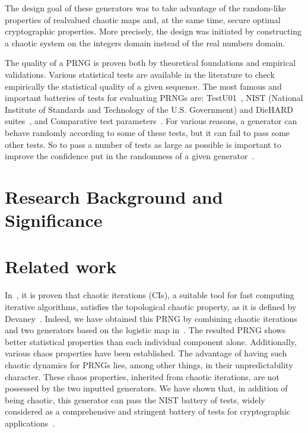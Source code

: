 The design goal of  these generators was to take advantage of the random-like properties of realvalued
chaotic maps and, at the same time, secure optimal cryptographic properties. More precisely, the design was initiated by constructing a chaotic system
on the integers domain instead of the real numbers domain.

The quality of a PRNG is proven both by theoretical foundations and empirical validations. 
Various statistical tests are available in the literature to check empirically the statistical quality of a given sequence.
The most famous and important batteries of tests for evaluating PRNGs are: TestU01~\cite{Lecuyer2009}, 
NIST (National Institute of Standards and Technology of the U.S. Government) and DieHARD suites~\cite{ANDREW2008,Marsaglia1996}, and Comparative test parameters~\cite{Menezes1997}.
For various reasons, a generator can behave randomly according to some of these tests, but it can fail to pass some other tests. 
So to pass a number of tests as large as possible is important to improve the confidence put in the randomness of a given generator~\cite{Turan2008}. 

\section{Research Background and Significance}


\section{Related work}
In~\cite{guyeux09,guyeux10}, it is proven that chaotic iterations (CIs), a suitable tool for fast computing iterative algorithms, satisfies the topological chaotic property, as it is defined by Devaney~\cite{Dev89}.
Indeed, we have obtained this PRNG by combining chaotic iterations and two generators based on the logistic map in~\cite{wang2009}.
The resulted PRNG shows better statistical properties than each individual component alone.
Additionally, various chaos properties have been established. 
The advantage of having such chaotic dynamics for PRNGs lies, among other things, in their unpredictability character.
These chaos properties, inherited from chaotic iterations, are not possessed by the two inputted generators.
We have shown that, in addition of being chaotic, this generator can pass the NIST battery of tests, widely considered as a comprehensive and stringent battery of tests for cryptographic applications~\cite{ANDREW2008}.

